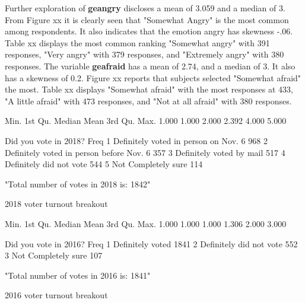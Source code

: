 \documentclass[12pt]{article}
\begin{document}
Further exploration of \textbf{geangry} discloses a mean of 3.059 and a median of 3.  From Figure xx it is clearly seen that "Somewhat Angry" is the most common among respondents.  It also indicates that the emotion angry has skewness -.06.  Table xx displays the most common ranking "Somewhat angry" with 391 responses, "Very angry" with 379 responses, and "Extremely angry" with 380 responses.  The variable \textbf{geafraid} has a mean of 2.74, and a median of 3.  It also has a skewness of 0.2.  Figure xx reports that subjects selected "Somewhat afraid" the most.  Table xx displays "Somewhat afraid" with the most responses at 433, "A little afraid" with 473 responses, and "Not at all afraid" with 380 responses.

\begin{table}[H]
\begin{Schunk}
\begin{Soutput}
   Min. 1st Qu.  Median    Mean 3rd Qu.    Max. 
  1.000   1.000   2.000   2.392   4.000   5.000 
\end{Soutput}
\begin{Soutput}
                     Did you vote in 2018? Freq
1     Definitely voted in person on Nov. 6  968
2 Definitely voted in person before Nov. 6  357
3                 Definitely voted by mail  517
4                  Definitely did not vote  544
5                      Not Completely sure  114
\end{Soutput}
\begin{Soutput}
[1] "Total number of votes in 2018 is:  1842"
\end{Soutput}
\end{Schunk}
\caption{2018 voter turnout breakout}
\end{table}

\begin{table}[H]
\begin{Schunk}
\begin{Soutput}
   Min. 1st Qu.  Median    Mean 3rd Qu.    Max. 
  1.000   1.000   1.000   1.306   2.000   3.000 
\end{Soutput}
\begin{Soutput}
    Did you vote in 2016? Freq
1        Definitely voted 1841
2 Definitely did not vote  552
3     Not Completely sure  107
\end{Soutput}
\begin{Soutput}
[1] "Total number of votes in 2016 is:  1841"
\end{Soutput}
\end{Schunk}
\caption{2016 voter turnout breakout}
\end{table}
\end{document}
